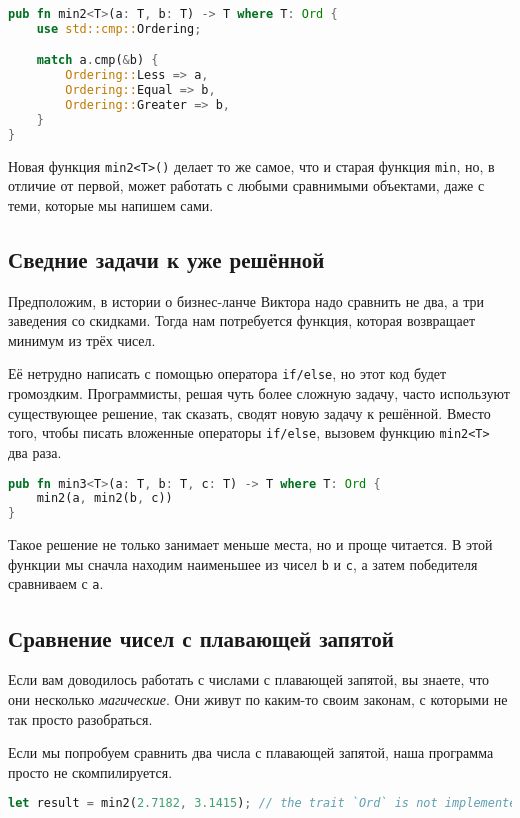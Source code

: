 \begin{lstlisting}[language=Rust]
    pub fn min2<T>(a: T, b: T) -> T where T: Ord {
    use std::cmp::Ordering;

    match a.cmp(&b) {
        Ordering::Less => a,
        Ordering::Equal => b,
        Ordering::Greater => b,
    }
}
\end{lstlisting}

Новая функция \texttt{min2<T>()} делает то же самое, что и старая функция \texttt{min}, но, в отличие от первой, может работать с любыми сравнимыми объектами, даже с теми, которые мы напишем сами.

\subsection{Сведние задачи к уже решённой}

Предположим, в истории о бизнес-ланче Виктора надо сравнить не два, а три заведения со скидками.
Тогда нам потребуется функция, которая возвращает минимум из трёх чисел.

Её нетрудно написать с помощью оператора \texttt{if/else}, но этот код будет громоздким.
Программисты, решая чуть более сложную задачу, часто используют существующее решение, так сказать, сводят новую задачу к решённой.
Вместо того, чтобы писать вложенные операторы \texttt{if/else}, вызовем функцию \texttt{min2<T>} два раза.

\begin{lstlisting}[language=Rust]
    pub fn min3<T>(a: T, b: T, c: T) -> T where T: Ord {
    min2(a, min2(b, c))
}
\end{lstlisting}

Такое решение не только занимает меньше места, но и проще читается.
В этой функции мы сначла находим наименьшее из чисел \texttt{b} и \texttt{c}, а затем победителя сравниваем с \texttt{a}.

\subsection{Сравнение чисел с плавающей запятой}

Если вам доводилось работать с числами с плавающей запятой, вы знаете, что они несколько \textit{магические}.
Они живут по каким-то своим законам, с которыми не так просто разобраться.

Если мы попробуем сравнить два числа с плавающей запятой, наша программа просто не скомпилируется.

\begin{lstlisting}[language=Rust]
    let result = min2(2.7182, 3.1415); // the trait `Ord` is not implemented for `{float}`
\end{lstlisting}

